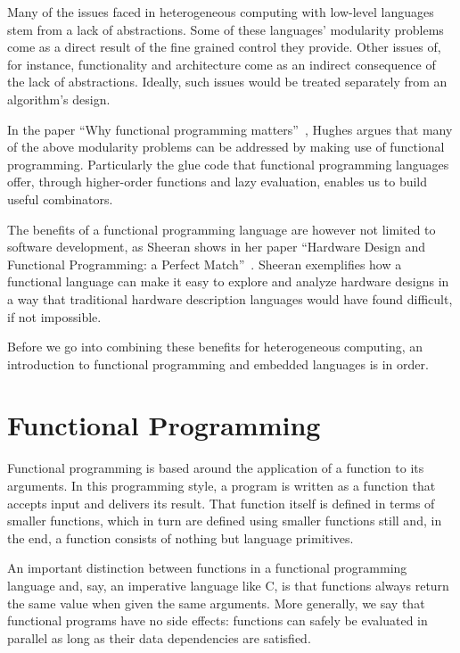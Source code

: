 \documentclass[../paper.tex]{subfiles}
\begin{document}
Many of the issues faced in heterogeneous computing with low-level languages stem from a lack of abstractions. Some of these languages' modularity problems come as a direct result of the fine grained control they provide. Other issues of, for instance, functionality and architecture come as an indirect consequence of the lack of abstractions. Ideally, such issues would be treated separately from an algorithm's design.


In the paper ``Why functional programming matters''~\cite{hughes1989}, Hughes argues that many of the above modularity problems can be addressed by making use of functional programming. Particularly the glue code that functional programming languages offer, through higher-order functions and lazy evaluation, enables us to build useful combinators.

The benefits of a functional programming language are however not limited to software development, as Sheeran shows in her paper ``Hardware Design and Functional Programming: a Perfect Match''~\cite{sheeran2005}. Sheeran exemplifies how a functional language can make it easy to explore and analyze hardware designs in a way that traditional hardware description languages would have found difficult, if not impossible.

Before we go into combining these benefits for heterogeneous computing, an introduction to functional programming and embedded languages is in order.

\section{Functional Programming}
\label{functional}

Functional programming is based around the application of a function to its arguments. In this programming style, a program is written as a function that accepts input and delivers its result. That function itself is defined in terms of smaller functions, which in turn are defined using smaller functions still and, in the end, a function consists of nothing but language primitives.

An important distinction between functions in a functional programming language and, say, an imperative language like C, is that functions always return the same value when given the same arguments. More generally, we say that functional programs have no side effects: functions can safely be evaluated in parallel as long as their data dependencies are satisfied.
\end{document}
